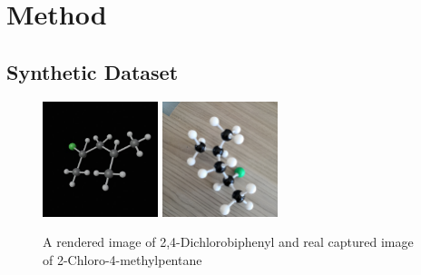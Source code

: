 \documentclass{article}
\begin{document}


\section{Method}
\subsection{Synthetic Dataset}
\begin{figure}
    \centering
    \includegraphics[width=0.3\textwidth]{generated}
    \includegraphics[width=0.3\textwidth]{cap}
    \caption{A rendered image of 2,4-Dichlorobiphenyl and real captured image of 2-Chloro-4-methylpentane}
    \label{fig:example}
\end{figure}
\end{document}
